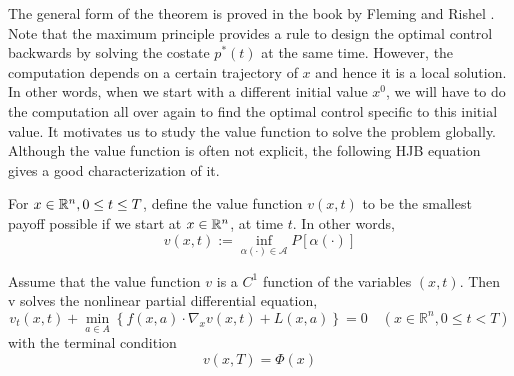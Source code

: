 The general form of the theorem is proved in the book by Fleming and Rishel \cite{fleming2012deterministic}. Note that the maximum principle provides a rule to design the optimal control backwards by solving the costate $p^*(t)$ at the same time. However, the computation depends on a certain trajectory of $x$ and hence it is a local solution. In other words, when we start with a different initial value $x^0$, we will have to do the computation all over again to find the optimal control specific to this initial value. It motivates us to study the value function to solve the problem globally. Although the value function is often not explicit, the following HJB equation gives a good characterization of it.
\begin{definition}
For $x \in \mathbb{R}^n, 0 \leq t \leq T$, define the value function $v(x,t)$ to be the smallest payoff possible if we start at $x \in \mathbb{R}^n$, at time $t$. In other words,
$$ v(x,t) := \inf _{\alpha(\cdot) \in \mathcal{A}} P[\alpha(\cdot)]$$
\end{definition}
\begin{theorem}
Assume that the value function $v$ is a $C^1$ function of the variables $(x,t)$. Then v solves the nonlinear partial differential equation, 
$$v_{t}(x, t)+\min _{a \in A}\left\{f(x, a) \cdot \nabla_{x} v(x, t)+L(x, a)\right\}=0 \quad\left(x \in \mathbb{R}^{n}, 0 \leq t<T\right)$$
with the terminal condition 
$$v(x,T) = \Phi(x)$$
\end{theorem}

